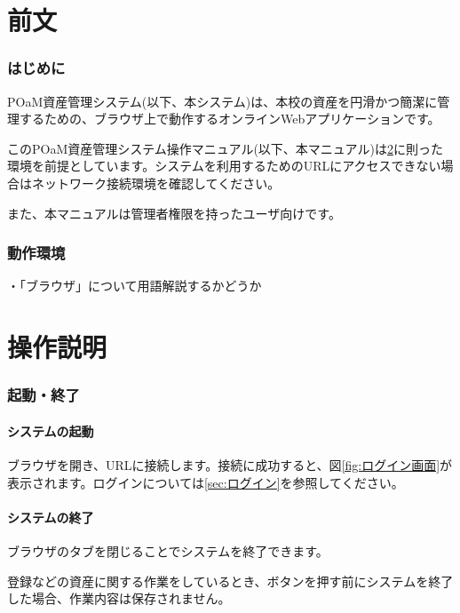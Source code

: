 \documentclass[11ptm]{jsarticle}
\begin{document}
\part{前文}
\hrulefill


\section{はじめに}
\label{sec:はじめに}
POaM資産管理システム(以下、本システム)は、本校の資産を円滑かつ簡潔に管理するための、ブラウザ上で動作するオンラインWebアプリケーションです。\par
このPOaM資産管理システム操作マニュアル(以下、本マニュアル)は\ref{sec:動作環境}に則った環境を前提としています。システムを利用するためのURLにアクセスできない場合はネットワーク接続環境を確認してください。\par
また、本マニュアルは管理者権限を持ったユーザ向けです。


\section{動作環境}
\label{sec:動作環境}
・「ブラウザ」について用語解説するかどうか


\clearpage
\part{操作説明}
\hrulefill


\section{起動・終了}
\label{sec:起動・終了}

\subsection{システムの起動}
\label{sec:システムの起動}
ブラウザを開き、URLに接続します。接続に成功すると、図\ref{fig:ログイン画面}が表示されます。ログインについては\ref{sec:ログイン}を参照してください。

\subsection{システムの終了}
\label{sec:システムの終了}
ブラウザのタブを閉じることでシステムを終了できます。\par
登録などの資産に関する作業をしているとき、ボタンを押す前にシステムを終了した場合、作業内容は保存されません。
\end{document}
